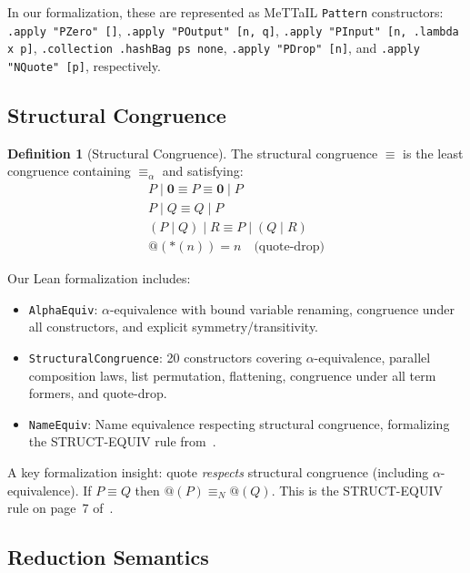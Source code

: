 \documentclass[11pt,a4paper]{article}
\makeatletter
\theoremstyle{definition}
\newtheorem{definition}[theorem]{Definition}
\theoremstyle{remark}
\newcommand{\pquote}[1]{@(#1)}
\newcommand{\pdrop}[1]{*(#1)}
\newcommand{\pnil}{\mathbf{0}}
\newcommand{\SC}{\equiv}
\newcommand{\alphaEq}{\equiv_\alpha}
\newcommand{\nameEq}{\equiv_N}
\newcommand{\lean}[1]{\lstinline[language=Lean4]{#1}}
\makeatother
\begin{document}
In our formalization, these are represented as MeTTaIL \lean{Pattern} constructors:
\lean{.apply "PZero" []}, \lean{.apply "POutput" [n, q]},
\lean{.apply "PInput" [n, .lambda x p]}, \lean{.collection .hashBag ps none},
\lean{.apply "PDrop" [n]}, and \lean{.apply "NQuote" [p]}, respectively.

\subsection{Structural Congruence}

\begin{definition}[Structural Congruence]
\label{def:sc}
The structural congruence $\SC$ is the least congruence containing $\alphaEq$
and satisfying:
\begin{gather*}
  P \mid \pnil \SC P \SC \pnil \mid P \\
  P \mid Q \SC Q \mid P \\
  (P \mid Q) \mid R \SC P \mid (Q \mid R) \\
  \pquote{\pdrop{n}} = n \quad \text{(quote-drop)}
\end{gather*}
\end{definition}

Our Lean formalization includes:
\begin{itemize}[nosep]
  \item \lean{AlphaEquiv}: $\alpha$-equivalence with bound variable renaming,
    congruence under all constructors, and explicit symmetry/transitivity.
  \item \lean{StructuralCongruence}: 20 constructors covering $\alpha$-equivalence,
    parallel composition laws, list permutation, flattening, congruence under
    all term formers, and quote-drop.
  \item \lean{NameEquiv}: Name equivalence respecting structural congruence,
    formalizing the STRUCT-EQUIV rule from~\cite{meredith2005}.
\end{itemize}

A key formalization insight: quote \emph{respects} structural congruence
(including $\alpha$-equivalence). If $P \SC Q$ then $\pquote{P} \nameEq \pquote{Q}$.
This is the STRUCT-EQUIV rule on page~7 of~\cite{meredith2005}.

\subsection{Reduction Semantics}
\label{sec:reduction}
\end{document}
